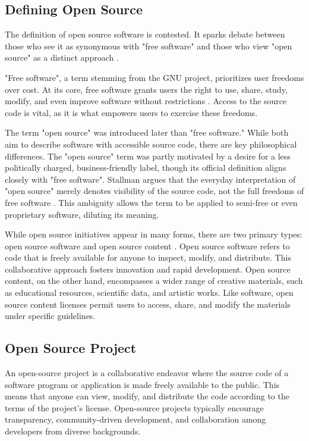 \subsection{Defining Open Source}
The definition of open source software is contested. It sparks debate between those who see it as synonymous with "free software" and those who view "open source" as a distinct approach \cite{FuggettaAlfonso2003Osse}.

"Free software", a term stemming from the GNU project, prioritizes user freedoms over cost. At its core, free software grants users the right to use, share, study, modify, and even improve software without restrictions \cite{Whatisfreesoftware}.  Access to the source code is vital, as it is what empowers users to exercise these freedoms.

The term "open source" was introduced later than "free software." While both aim to describe software with accessible source code, there are key philosophical differences. The "open source" term was partly motivated by a desire for a less politically charged, business-friendly label, though its official definition aligns closely with "free software". Stallman argues that the everyday interpretation of "open source" merely denotes visibility of the source code, not the full freedoms of free software \cite{StallmanWhyOpenSource}. This ambiguity allows the term to be applied to semi-free or even proprietary software, diluting its meaning.


While open source initiatives appear in many forms, there are two primary types: open source software and open source content \cite{OregShaul2008Emfc}. Open source software refers to code that is freely available for anyone to inspect, modify, and distribute. This collaborative approach fosters innovation and rapid development. Open source content, on the other hand, encompasses a wider range of creative materials, such as educational resources, scientific data, and artistic works. Like software, open source content licenses permit users to access, share, and modify the materials under specific guidelines.

\subsection{Open Source Project}
An open-source project is a collaborative endeavor where the source code of a software program or application is made freely available to the public. This means that anyone can view, modify, and distribute the code according to the terms of the project's license. Open-source projects typically encourage transparency, community-driven development, and collaboration among developers from diverse backgrounds.

